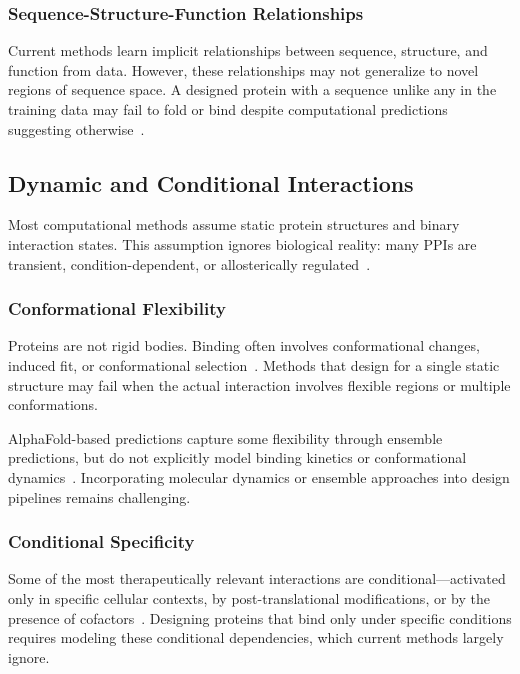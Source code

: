 \subsubsection{Sequence-Structure-Function Relationships}

Current methods learn implicit relationships between sequence, structure, and function from data. However, these relationships may not generalize to novel regions of sequence space. A designed protein with a sequence unlike any in the training data may fail to fold or bind despite computational predictions suggesting otherwise~\cite{dauparas2022proteinmpnn}.

\subsection{Dynamic and Conditional Interactions}
\label{subsec:dynamic}

Most computational methods assume static protein structures and binary interaction states. This assumption ignores biological reality: many PPIs are transient, condition-dependent, or allosterically regulated~\cite{mcgary2010dynamic}.

\subsubsection{Conformational Flexibility}

Proteins are not rigid bodies. Binding often involves conformational changes, induced fit, or conformational selection~\cite{barlow2018flexddg}. Methods that design for a single static structure may fail when the actual interaction involves flexible regions or multiple conformations.

AlphaFold-based predictions capture some flexibility through ensemble predictions, but do not explicitly model binding kinetics or conformational dynamics~\cite{abramson2024alphafold3}. Incorporating molecular dynamics or ensemble approaches into design pipelines remains challenging.

\subsubsection{Conditional Specificity}

Some of the most therapeutically relevant interactions are conditional---activated only in specific cellular contexts, by post-translational modifications, or by the presence of cofactors~\cite{mcgary2010dynamic}. Designing proteins that bind only under specific conditions requires modeling these conditional dependencies, which current methods largely ignore.


